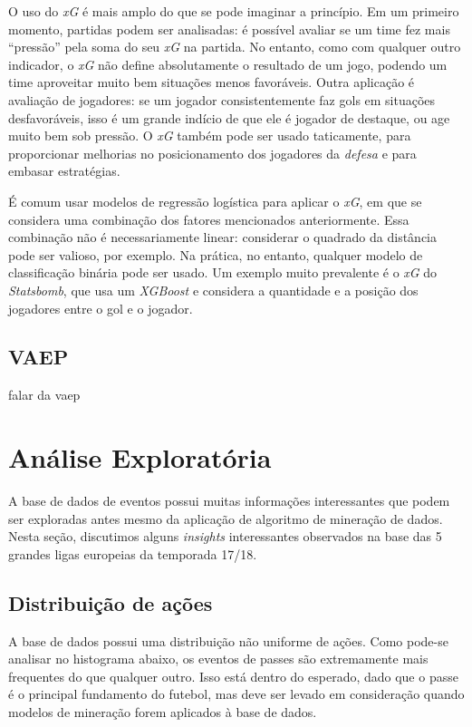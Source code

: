 \documentclass{article}
\begin{document}
O uso do \textit{xG} é mais amplo do que se pode imaginar a princípio. Em um
primeiro momento, partidas podem ser analisadas: é possível avaliar se um time
fez mais ``pressão'' pela soma do seu \textit{xG} na partida. No entanto, como
com qualquer outro indicador, o \textit{xG} não define absolutamente o
resultado de um jogo, podendo um time aproveitar muito bem situações menos
favoráveis. Outra aplicação é avaliação de jogadores: se um jogador
consistentemente faz gols em situações desfavoráveis, isso é um grande indício
de que ele é jogador de destaque, ou age muito bem sob pressão. O \textit{xG}
também pode ser usado taticamente, para proporcionar melhorias no
posicionamento dos jogadores da \textit{defesa} e para embasar estratégias.

É comum usar modelos de regressão logística para aplicar o \textit{xG}, em que
se considera uma combinação dos fatores mencionados anteriormente. Essa
combinação não é necessariamente linear: considerar o quadrado da distância
pode ser valioso, por exemplo. Na prática, no entanto, qualquer modelo de
classificação binária pode ser usado. Um exemplo muito prevalente é o
\textit{xG} do \textit{Statsbomb}, que usa um \textit{XGBoost} e considera a
quantidade e a posição dos jogadores entre o gol e o jogador.


\subsection{VAEP}

falar da vaep \cite{vaep}

\section{Análise Exploratória}

A base de dados de eventos possui muitas informações interessantes que podem
ser exploradas antes mesmo da aplicação
de algoritmo de mineração de dados. Nesta seção, discutimos alguns
\textit{insights} interessantes observados na base das 5 grandes ligas
europeias da temporada 17/18.

\subsection{Distribuição de ações}

A base de dados possui uma distribuição não uniforme de ações. Como pode-se
analisar no histograma abaixo, os eventos de passes são extremamente mais
frequentes do que qualquer outro. Isso está dentro do esperado, dado que o
passe é o principal fundamento do futebol, mas deve ser levado em consideração
quando modelos de mineração forem aplicados à base de dados.
\end{document}
